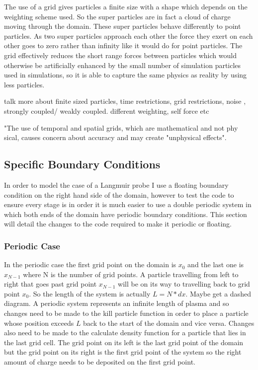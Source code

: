 \documentclass[12pt]{article}
\begin{document}
The use of a grid gives particles a finite size with a shape which depends on the weighting scheme used. So the super particles are in fact a cloud of charge moving through the domain. These super particles behave differently to point particles. As two super particles approach each other the force they exert on each other goes to zero rather than infinity like it would do for point particles. The grid effectively reduces the short range forces between particles which would otherwise be artificially enhanced by the small number of simulation particles used in simulations, so it is able to capture the same physics as reality by using less particles.



talk more about finite sized particles, 
time restrictions,
grid restrictions, 
noise , 
strongly coupled/ weakly coupled. 
different weighting, self force etc

"The use of
temporal and spatial grids, which are mathematical and not phy
sical, causes
concern about accuracy and may create "unphysical effects".
\subsection{Specific Boundary Conditions}
In order to model the case of a Langmuir probe I use a floating boundary condition on the right hand side of the domain, however to test the code to ensure every stage is in order it is much easier to use a double periodic system in which both ends of the domain have periodic boundary conditions. This section will detail the changes to the code required to make it periodic or floating. 

\subsubsection{Periodic Case}
In the periodic case the first grid point on the domain is $x_0$ and the last one is $x_{N-1}$ where N is the number of grid points. A particle travelling from left to right that goes past grid point $x_{N-1}$ will be on its way to travelling back to grid point $x_0$. So the length of the system is actually $L=N*dx$. Maybe get a dashed diagram. A periodic system represents an infinite length of plasma and so changes need to be made to the kill particle function in order to place a particle whose position exceeds $L$ back to the start of the domain and vice versa. Changes also need to be made to the calculate density function for a particle that lies in the last grid cell. The grid point on its left is the last grid point of the domain but the grid point on its right is the first grid point of the system so the right amount of charge needs to be deposited on the first grid point.  
\end{document}
